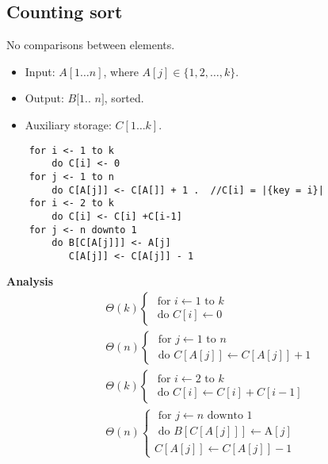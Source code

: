 \documentclass[11pt,toc=twocol]{elegantbook}
\begin{document}
\subsection{Counting sort}
No comparisons between elements.
\begin{itemize}
    \item Input: $A[1 \ldots n]$, where $A[j] \in\{1,2, \ldots, k\}$.
    \item Output: $B[1$.. $n]$, sorted.
    \item Auxiliary storage: $C[1 \ldots k]$.
\end{itemize}
\begin{lstlisting}
    for i <- 1 to k
        do C[i] <- 0
    for j <- 1 to n
        do C[A[j]] <- C[A[]] + 1 .  //C[i] = |{key = i}|
    for i <- 2 to k
        do C[i] <- C[i] +C[i-1]
    for j <- n downto 1
        do B[C[A[j]]] <- A[j]
           C[A[j]] <- C[A[j]] - 1 
\end{lstlisting}
\begin{note}
\textbf{Analysis}
$$
\begin{aligned}
&\Theta(k)\left\{\begin{array}{r}
\text { for } i \leftarrow 1 \text { to } k \\
\text { do } C[i] \leftarrow 0
\end{array}\right.\\
&\Theta(n)\left\{\begin{array}{c}
\text { for } j \leftarrow 1 \text { to } n \\
\text { do } C[A[j]] \leftarrow C[A[j]]+1
\end{array}\right.\\
&\Theta(k)\left\{\begin{array}{c}
\text { for } i \leftarrow 2 \text { to } k \\
\text { do } C[i] \leftarrow C[i]+C[i-1]
\end{array}\right.\\
&\Theta(n)\left\{\begin{array}{c}
\text { for } j \leftarrow n \text { downto } 1 \\
\text { do } B[C[A[j]]] \leftarrow \mathrm{A}[j] \\
C[A[j]] \leftarrow C[A[j]]-1
\end{array}\right.
\end{aligned}
$$
\end{note}
\end{document}
